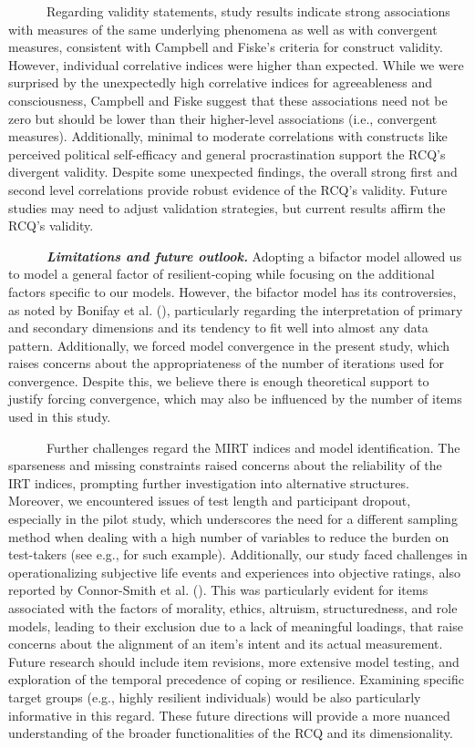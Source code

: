 \documentclass[
  man,floatsintext]{apa7}
\begin{document}
~~~~~~Regarding validity statements, study results indicate strong associations with measures of the same underlying phenomena as well as with convergent measures, consistent with Campbell and Fiske's criteria for construct validity. However, individual correlative indices were higher than expected. While we were surprised by the unexpectedly high correlative indices for agreeableness and consciousness, Campbell and Fiske suggest that these associations need not be zero but should be lower than their higher-level associations (i.e., convergent measures). Additionally, minimal to moderate correlations with constructs like perceived political self-efficacy and general procrastination support the RCQ's divergent validity. Despite some unexpected findings, the overall strong first and second level correlations provide robust evidence of the RCQ's validity. Future studies may need to adjust validation strategies, but current results affirm the RCQ's validity.

~~~~~~\textbf{\emph{Limitations and future outlook.}} Adopting a bifactor model allowed us to model a general factor of resilient-coping while focusing on the additional factors specific to our models. However, the bifactor model has its controversies, as noted by Bonifay et al. (), particularly regarding the interpretation of primary and secondary dimensions and its tendency to fit well into almost any data pattern. Additionally, we forced model convergence in the present study, which raises concerns about the appropriateness of the number of iterations used for convergence. Despite this, we believe there is enough theoretical support to justify forcing convergence, which may also be influenced by the number of items used in this study.

~~~~~~Further challenges regard the MIRT indices and model identification. The sparseness and missing constraints raised concerns about the reliability of the IRT indices, prompting further investigation into alternative structures. Moreover, we encountered issues of test length and participant dropout, especially in the pilot study, which underscores the need for a different sampling method when dealing with a high number of variables to reduce the burden on test-takers (see e.g.,  for such example). Additionally, our study faced challenges in operationalizing subjective life events and experiences into objective ratings, also reported by Connor-Smith et al. (). This was particularly evident for items associated with the factors of morality, ethics, altruism, structuredness, and role models, leading to their exclusion due to a lack of meaningful loadings, that raise concerns about the alignment of an item's intent and its actual measurement. Future research should include item revisions, more extensive model testing, and exploration of the temporal precedence of coping or resilience. Examining specific target groups (e.g., highly resilient individuals) would be also particularly informative in this regard. These future directions will provide a more nuanced understanding of the broader functionalities of the RCQ and its dimensionality.
\end{document}
